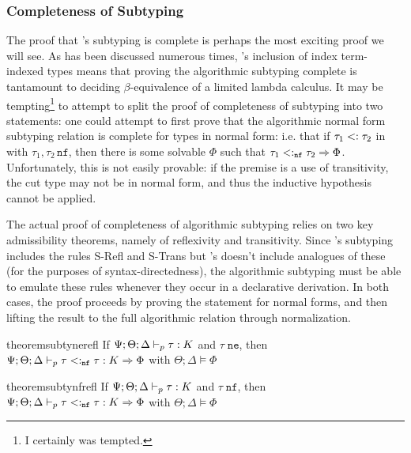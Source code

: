 \subsubsection{Completeness of Subtyping}
The proof that \bilambdaamor's subtyping is complete is perhaps the most exciting proof we will see. As has been discussed numerous times, \dlambdaamor's inclusion of index term-indexed types means that proving the algorithmic subtyping complete is tantamount to deciding $\beta$-equivalence of a limited lambda calculus. It may be tempting\footnote{
I certainly was tempted.
} to attempt to split the proof of completeness of subtyping into two statements: one could attempt to first prove that the algorithmic normal form subtyping relation is complete for types in normal form: i.e. that if $\tau_1 <: \tau_2$ in \dlambdaamor with $\tau_1,\tau_2 \, \texttt{nf}$, then there is some solvable $\Phi$ such that $\tau_1 <:_{\texttt{nf}} \tau_2 \Rightarrow \Phi$. Unfortunately, this is not easily provable: if the premise is a use of transitivity, the cut type may not be in normal form, and thus the inductive hypothesis cannot be applied.

The actual proof of completeness of algorithmic subtyping relies on two key admissibility theorems, namely of reflexivity and transitivity. Since \dlambdaamor's subtyping includes the rules S-Refl and S-Trans but \bilambdaamor's doesn't include analogues of these (for the purposes of syntax-directedness), the algorithmic subtyping must be able to emulate these rules whenever they occur in a declarative derivation. In both cases, the proof proceeds by proving the statement for normal forms, and then lifting the result to the full algorithmic relation through normalization.

\begin{restatable}{theorem}{subtynerefl}
If $\Psi ; \Theta ;  \Delta \vdash_p \tau : K$ and $\tau \;\texttt{ne}$, then $\Psi ; \Theta ;  \Delta \vdash_p \tau<:_{\texttt{nf}} \tau : K \Rightarrow \Phi$ with $\Theta ; \Delta \vDash \Phi$
\label{thm:subtyne-refl}
\end{restatable}

\begin{restatable}{theorem}{subtynfrefl}
If $\Psi ; \Theta ;  \Delta \vdash_p \tau : K$ and $\tau \;\texttt{nf}$, then $\Psi ; \Theta ;  \Delta \vdash_p \tau<:_{\texttt{nf}} \tau : K \Rightarrow \Phi$ with $\Theta ; \Delta \vDash \Phi$
\label{thm:subtynf-refl}
\end{restatable}

